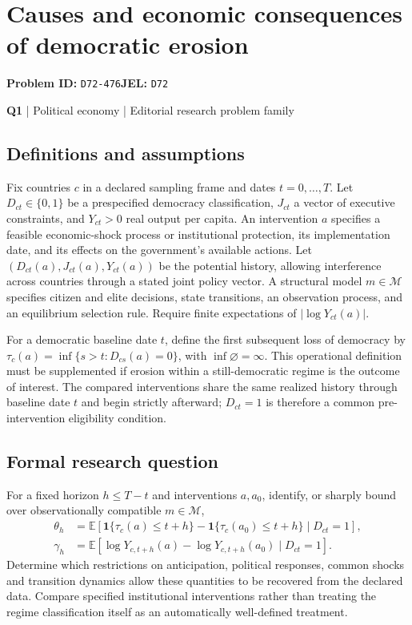 \documentclass[11pt,a4paper]{article}
\begin{document}
\section*{Causes and economic consequences of democratic erosion}
\textbf{Problem ID:} \texttt{D72-476}\quad \textbf{JEL:} \texttt{D72}\par
\label{problem:OP-0121}
\label{atlas:prob:Q1}
{\sffamily\small\color{muted}\textbf{Q1} | Political economy | Editorial research problem family\par}
\subsection*{Definitions and assumptions}
Fix countries $c$ in a declared sampling frame and dates $t=0,\ldots,T$. Let $D_{ct}\in\{0,1\}$ be a prespecified democracy classification, $J_{ct}$ a vector of executive constraints, and $Y_{ct}>0$ real output per capita. An intervention $a$ specifies a feasible economic-shock process or institutional protection, its implementation date, and its effects on the government's available actions. Let $(D_{ct}(a),J_{ct}(a),Y_{ct}(a))$ be the potential history, allowing interference across countries through a stated joint policy vector. A structural model $m\in\mathcal M$ specifies citizen and elite decisions, state transitions, an observation process, and an equilibrium selection rule. Require finite expectations of $|\log Y_{ct}(a)|$.

For a democratic baseline date $t$, define the first subsequent loss of democracy by $\tau_c(a)=\inf\{s>t:D_{cs}(a)=0\}$, with $\inf\varnothing=\infty$. This operational definition must be supplemented if erosion within a still-democratic regime is the outcome of interest. The compared interventions share the same realized history through baseline date $t$ and begin strictly afterward; $D_{ct}=1$ is therefore a common pre-intervention eligibility condition.
\subsection*{Formal research question}
For a fixed horizon $h\leq T-t$ and interventions $a,a_0$, identify, or sharply bound over observationally compatible $m\in\mathcal M$,
\[
\begin{aligned}
\theta_h&=\mathbb E\!\left[\mathbf1\{\tau_c(a)\leq t+h\}-\mathbf1\{\tau_c(a_0)\leq t+h\}\mid D_{ct}=1\right],\\
\gamma_h&=\mathbb E[\log Y_{c,t+h}(a)-\log Y_{c,t+h}(a_0)\mid D_{ct}=1].
\end{aligned}
\]
Determine which restrictions on anticipation, political responses, common shocks and transition dynamics allow these quantities to be recovered from the declared data. Compare specified institutional interventions rather than treating the regime classification itself as an automatically well-defined treatment.
\end{document}
